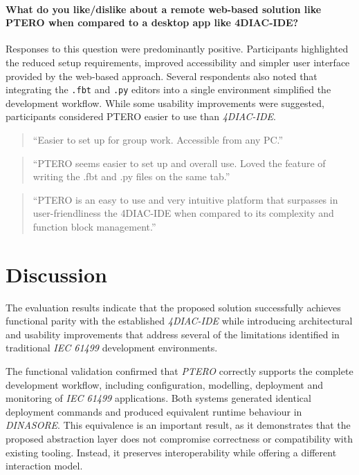 \paragraph{What do you like/dislike about a remote web-based solution like PTERO when compared to a desktop app like 4DIAC-IDE?}
Responses to this question were predominantly positive. Participants highlighted the reduced setup requirements, improved accessibility and simpler user interface provided by the web-based approach. Several respondents also noted that integrating the \texttt{.fbt} and \texttt{.py} editors into a single environment simplified the development workflow. While some usability improvements were suggested, participants considered PTERO easier to use than \textit{4DIAC-IDE}.

\begin{quote}
``Easier to set up for group work. Accessible from any PC.''
\end{quote}

\begin{quote}
``PTERO seems easier to set up and overall use. Loved the feature of writing the .fbt and .py files on the same tab.''
\end{quote}

\begin{quote}
``PTERO is an easy to use and very intuitive platform that surpasses in user-friendliness the 4DIAC-IDE when compared to its complexity and function block management.''
\end{quote}

\section{Discussion}
The evaluation results indicate that the proposed solution successfully achieves functional parity with the established \textit{4DIAC-IDE} while introducing architectural and usability improvements that address several of the limitations identified in traditional \textit{IEC 61499} development environments.

The functional validation confirmed that \textit{PTERO} correctly supports the complete development workflow, including configuration, modelling, deployment and monitoring of \textit{IEC 61499} applications. Both systems generated identical deployment commands and produced equivalent runtime behaviour in \textit{DINASORE}. This equivalence is an important result, as it demonstrates that the proposed abstraction layer does not compromise correctness or compatibility with existing tooling. Instead, it preserves interoperability while offering a different interaction model.

